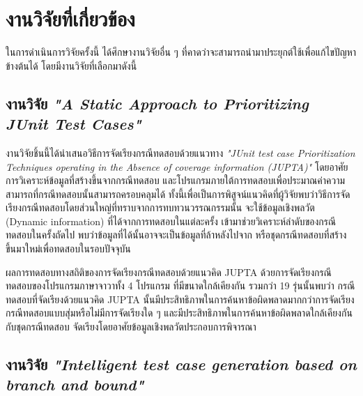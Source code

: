 \section{งานวิจัยที่เกี่ยวข้อง} 
\label{sec:related-work}

ในการดำเนินการวิจัยครั้งนี้ ได้ศึกษางานวิจัยอื่น ๆ ที่คาดว่าจะสามารถนำมาประยุกต์ใช้เพื่อแก้ไขปัญหาข้างต้นได้ โดยมีงานวิจัยที่เลือกมาดังนี้

\subsection{งานวิจัย {\it "A Static Approach to Prioritizing JUnit Test Cases"} \cite{6363461}}

งานวิจัยชิ้นนี้ได้นำเสนอวิธีการจัดเรียงกรณีทดสอบด้วยแนวทาง \emph{"JUnit test case Prioritization Techniques operating in the Absence of coverage information (JUPTA)"} 
โดยอาศัยการวิเคราะห์ข้อมูล{\scg}ที่สร้างขึ้นจากกรณีทดสอบ และโปรแกรมภายใต้การทดสอบเพื่อประมาณค่าความสามารถที่กรณีทดสอบนั้นสามารถครอบคลุม{\sourcecode}ได้
ทั้งนี้เพื่อเป็นการพิสูจน์แนวคิดที่ผู้วิจัยพบว่าวิธีการจัดเรียงกรณีทดสอบโดยส่วนใหญ่ที่ทราบจากการทบทวนวรรณกรรมนั้น จะใช้ข้อมูลเชิงพลวัต (Dynamic information)
ที่ได้จากการทดสอบ{\sourcecode}ในแต่ละครั้ง เข้ามาช่วยวิเคราะห์ลำดับของกรณีทดสอบในครั้งถัดไป พบว่าข้อมูลที่ได้นั้นอาจจะเป็นข้อมูลที่ล้าหลังไปจาก{\sourcecode} 
หรือชุดกรณีทดสอบที่สร้างขึ้นมาใหม่เพื่อทดสอบในรอบปัจจุบัน 

ผลการทดสอบทางสถิติของการจัดเรียงกรณีทดสอบด้วยแนวคิด JUPTA ด้วยการจัดเรียงกรณีทดสอบของโปรแกรมภาษาจาวาทั้ง 4 โปรแกรม ที่มีขนาดใกล้เคียงกัน
รวมกว่า 19 รุ่นนั้นพบว่า กรณีทดสอบที่จัดเรียงด้วยแนวคิด JUPTA นั้นมีประสิทธิภาพในการค้นหาข้อผิดพลาดมากกว่าการจัดเรียงกรณีทดสอบแบบสุ่มหรือไม่มีการจัดเรียงใด ๆ 
และมีประสิทธิภาพในการค้นหาข้อผิดพลาดใกล้เคียงกันกับชุดกรณีทดสอบ จัดเรียงโดยอาศัยข้อมูลเชิงพลวัตประกอบการพิจารณา

\subsection{งานวิจัย {\it "Intelligent test case generation based on branch and bound"} \cite{XING201491}}
\label{sec:sub:bandb}

